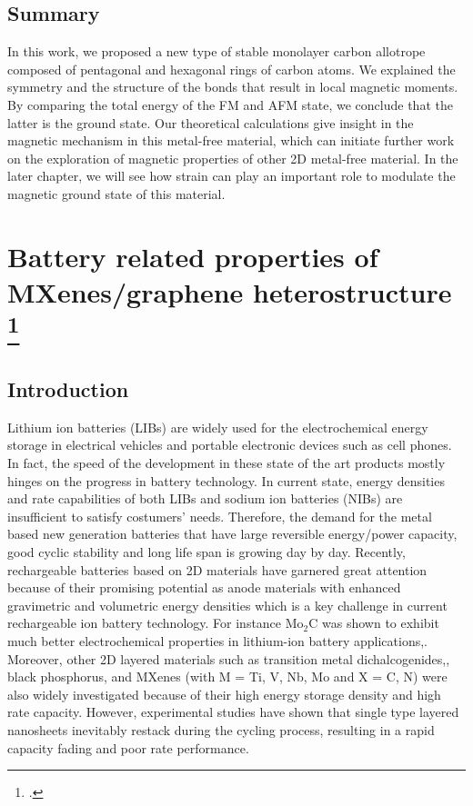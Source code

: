 \subsection{Summary}
In this work, we proposed a new type of stable monolayer carbon allotrope composed of pentagonal and hexagonal rings of carbon atoms. We explained the symmetry and the structure of the bonds that result in local magnetic moments. By comparing the total energy of the FM and AFM state, we conclude that the latter is the ground state. Our theoretical calculations give insight in the magnetic mechanism in this metal-free material, which can initiate further work on the exploration of magnetic properties of other 2D metal-free material. In the later chapter, we will see how strain can play an important role to modulate the magnetic ground state of this material.


\section[Battery related properties of MXenes/graphene heterostructure]{Battery related properties of MXenes/graphene heterostructure \footcite[This work will be published as:][]{Aierken2017.battery}}

\subsection{Introduction}
Lithium ion batteries (LIBs) are widely used for the electrochemical energy storage in electrical vehicles and portable electronic devices such as cell phones. In fact, the speed of the development in these state of the art products mostly hinges on the progress in battery technology. In current state, energy densities and rate capabilities of both LIBs and sodium ion batteries (NIBs) are insufficient to satisfy costumers' needs. Therefore, the demand for the metal based new generation batteries that have large reversible energy/power capacity, good cyclic stability and long life span is growing day by day. Recently, rechargeable batteries based on 2D materials have garnered great attention because of their promising potential as anode materials with enhanced gravimetric and volumetric energy densities which is a key challenge in current rechargeable ion battery technology. For instance Mo$_2$C was shown to exhibit much better electrochemical properties in lithium-ion battery applications,\cite{mo2c-ref8, mo2c-ref10}. Moreover, other 2D layered materials such as transition metal dichalcogenides,\cite{mo2c-ref11, mo2c-ref12}, black phosphorus\cite{mo2c-ref18, mo2c-ref20}, and MXenes (with M = Ti, V, Nb, Mo and X = C, N)\cite{mo2c-ref13, mo2c-ref17} were also widely investigated because of their high energy storage density and high rate capacity. However, experimental studies have shown that single type layered nanosheets inevitably restack during the cycling process, resulting in a rapid capacity fading and poor rate performance. 


